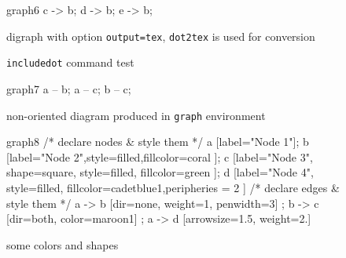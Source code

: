 \documentclass[a4paper,10pt]{article}
\begin{document}
\begin{figure}
  \begin{digraph}[output=tex]{graph6}
      c -> b;
      d -> b;
      e -> b;
  \end{digraph}
  \caption{digraph with option \texttt{output=tex}, \texttt{dot2tex} is used for conversion}
\end{figure}

\begin{figure}
 \caption{\texttt{includedot} command test}
\end{figure}

\begin{figure}
  \begin{graphviz}[scale=0.5]{graph7}
      a -- b;
      a -- c;
      b -- c;
  \end{graphviz}
  \caption{non-oriented diagram produced in \texttt{graph} environment}
\end{figure}

\begin{figure}
  \begin{digraph}[scale=0.8]{graph8}
    /* declare nodes & style them */
    a [label="Node 1"];
    b [label="Node 2",style=filled,fillcolor=coral ];
    c [label="Node 3", shape=square, style=filled, fillcolor=green ];
    d [label="Node 4", style=filled, fillcolor=cadetblue1,peripheries = 2  ]
    /* declare edges & style them */
    a -> b [dir=none, weight=1, penwidth=3] ;
    b -> c [dir=both, color=maroon1] ;
    a -> d [arrowsize=1.5, weight=2.]
  \end{digraph}
  \caption{some colors and shapes}
\end{figure}
\end{document}
